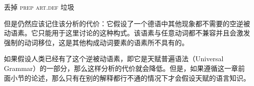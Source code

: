 \begin{exe}
\begin{xlist}[iv.]
\begin{exe}
\begin{xlist}[iv.]
{{	丢掉 \textsc{prep} \textsc{art}.\textsc{def} 垃圾\\
}
\zl}

\noindent
但是仍然应该记住该分析的代价：它假设了一个德语中其他现象都不需要的空逆被动语素。它只能用于这里讨论的这种构式。该语素与任意动词都不兼容并且会激发强制的动词移位，这是其他构成动词要素的语素所不具有的。

如果假设人类已经有了这个逆被动语素，即它是天赋普遍语法\indexug（Universal Grammar）的一部分，那么这样分析的代价就会降低。但是，如果遵循这一章前面小节的论述，那么只有在别的解释都行不通的情况下才会假设天赋的语言知识。


\end{xlist}
\end{exe}
\end{xlist}
\end{exe}
